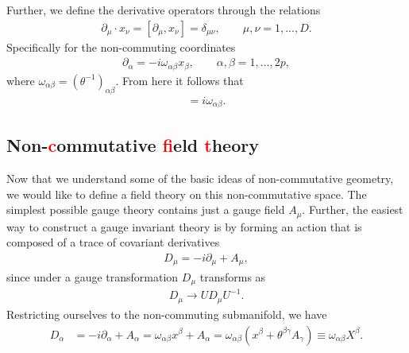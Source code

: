     Further, we define the derivative operators through the relations
    \begin{align}
        \partial_{\mu} \cdot x_{\nu} = [\partial_{\mu}, x_{\nu}] = \delta_{\mu \nu}, \qquad \mu,\nu = 1,...,D.
    \end{align}
    Specifically for the non-commuting coordinates
    \begin{align}
        \partial_{\alpha}= -i \omega_{\alpha \beta} x_{\beta}, \qquad \alpha, \beta = 1,...,2p,
    \end{align}
    where $\omega_{\alpha \beta} = \left(\theta^{-1} \right)_{\alpha \beta}$. From here it follows that
    \begin{align}
        [\partial_{\alpha}, \partial_{\beta}] = i \omega_{\alpha \beta}.
    \end{align}


    \subsection{Non-\textcolor{red}{c}ommutative \textcolor{red}{f}ield \textcolor{red}{t}heory}

    Now that we understand some of the basic ideas of non-commutative geometry, we would like to define a field theory on this non-commutative space. The simplest possible gauge theory contains just a gauge field $A_{\mu}$. Further, the easiest way to construct a gauge invariant theory is by forming an action that is composed of a trace of covariant derivatives 
    \begin{align}
        D_{\mu} = -i \partial_{\mu} + A_{\mu},
    \end{align}
    since under a gauge transformation $D_{\mu}$ transforms as
    \begin{align}
        D_{\mu} \rightarrow U D_{\mu} U^{-1}.
    \end{align}
    Restricting ourselves to the non-commuting submanifold, we have
    \begin{align}
        D_{\alpha} &= -i \partial_{\alpha} + A_{\alpha} = \omega_{\alpha \beta}x^{\beta}+ A_{\alpha} = \omega_{\alpha \beta} \left( x^{\beta}+ \theta^{\beta \gamma} A_{\gamma} \right) \equiv \omega_{\alpha \beta} X^{\beta}.
    \end{align}
    

